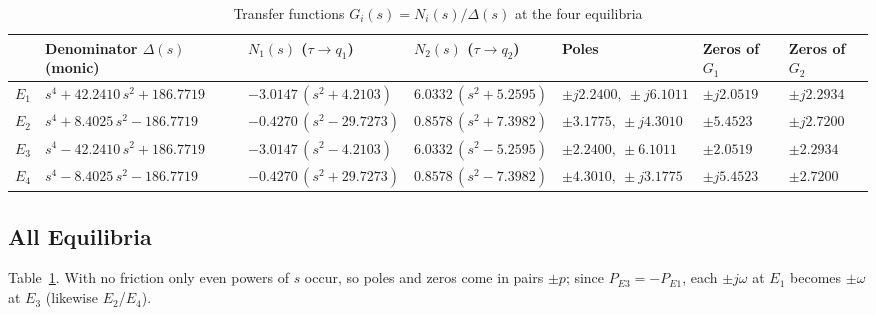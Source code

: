 \documentclass[10pt,letterpaper]{article}
\begin{document}
\begin{table}[h]
\centering
\caption{Transfer functions $G_i(s)=N_i(s)/\Delta(s)$ at the four equilibria}\label{tab:tf}
\footnotesize\setlength{\tabcolsep}{4pt}\renewcommand{\arraystretch}{0.85}
\begin{tabular}{@{}cllllll@{}}
\toprule
 & Denominator $\Delta(s)$ (monic) & $N_1(s)$ \;($\tau\to q_1$) & $N_2(s)$ \;($\tau\to q_2$) & Poles & Zeros of $G_1$ & Zeros of $G_2$\\
\midrule
$E_1$ & $s^4+42.2410\,s^2+186.7719$ & $-3.0147\,(s^2+4.2103)$ & $6.0332\,(s^2+5.2595)$ & $\pm j2.2400,\ \pm j6.1011$ & $\pm j2.0519$ & $\pm j2.2934$\\
$E_2$ & $s^4+8.4025\,s^2-186.7719$ & $-0.4270\,(s^2-29.7273)$ & $0.8578\,(s^2+7.3982)$ & $\pm3.1775,\ \pm j4.3010$ & $\pm5.4523$ & $\pm j2.7200$\\
$E_3$ & $s^4-42.2410\,s^2+186.7719$ & $-3.0147\,(s^2-4.2103)$ & $6.0332\,(s^2-5.2595)$ & $\pm2.2400,\ \pm6.1011$ & $\pm2.0519$ & $\pm2.2934$\\
$E_4$ & $s^4-8.4025\,s^2-186.7719$ & $-0.4270\,(s^2+29.7273)$ & $0.8578\,(s^2-7.3982)$ & $\pm4.3010,\ \pm j3.1775$ & $\pm j5.4523$ & $\pm2.7200$\\
\bottomrule
\end{tabular}
\end{table}

\subsection{All Equilibria}
Table~\ref{tab:tf}. With no friction only even powers of $s$ occur, so poles and zeros come in pairs $\pm p$; since $P_{E3}=-P_{E1}$, each $\pm j\omega$ at $E_1$ becomes $\pm\omega$ at $E_3$ (likewise $E_2$/$E_4$).

\end{document}
